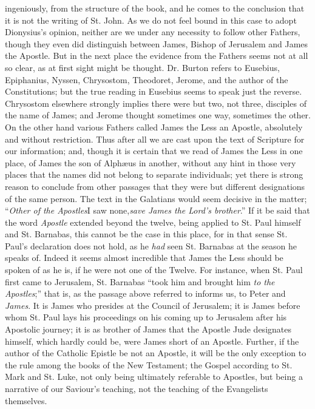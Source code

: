 ingeniously, from the structure of the book, and he comes to the
conclusion that it is not the writing of St. John. As we do not feel
bound in this case to adopt Dionysius's opinion, neither are we under
any necessity to follow other Fathers, though they even did distinguish
between James, Bishop of Jerusalem and James the Apostle. But in the
next place the evidence from the Fathers seems not at all so clear, as
at first sight might be thought. Dr. Burton refers to Eusebius,
Epiphanius, Nyssen, Chrysostom, Theodoret, Jerome, and the author of the
Constitutions; but the true reading in Eusebius seems to speak just the
reverse. Chrysostom elsewhere strongly implies there were but two, not
three, disciples of the name of James; and Jerome thought sometimes one
way, sometimes the other. On the other hand various Fathers called James
the Less an Apostle, absolutely and without restriction. Thus after all
we are cast upon the text of Scripture for our information; and, though
it is certain that we read of James the Less in one place, of James the
son of Alphæus in another, without any hint in those very places that
the names did not belong to separate individuals; yet there is strong
reason to conclude from other passages that they were but different
designations of the same person. The text in the Galatians would seem
decisive in the matter; ``\emph{Other of the Apostles}I saw none,\emph{save James the Lord's brother}.'' If it be said that the word \emph{Apostle}
extended beyond the twelve, being applied to St. Paul himself and St.
Barnabas, this cannot be the case in this place, for in that sense St.
Paul's declaration does not hold, as he \emph{had} seen St. Barnabas
at the season he speaks of. Indeed it seems almost incredible that James
the Less should be spoken of as he is, if he were not one of the Twelve.
For instance, when St. Paul first came to Jerusalem, St. Barnabas ``took him and brought him \emph{to the Apostles};'' that is, as the
passage above referred to informs us, to Peter and \emph{James}. It is
James who presides at the Council of Jerusalem; it is James before whom
St. Paul lays his proceedings on his coming up to Jerusalem after his
Apostolic journey; it is as brother of James that the Apostle Jude
designates himself, which hardly could be, were James short of an
Apostle. Further, if the author of the Catholic Epistle be not an
Apostle, it will be the only exception to the rule among the books of
the New Testament; the Gospel according to St. Mark and St. Luke, not
only being ultimately referable to Apostles, but being a narrative of
our Saviour's teaching, not the teaching of the Evangelists
themselves.


